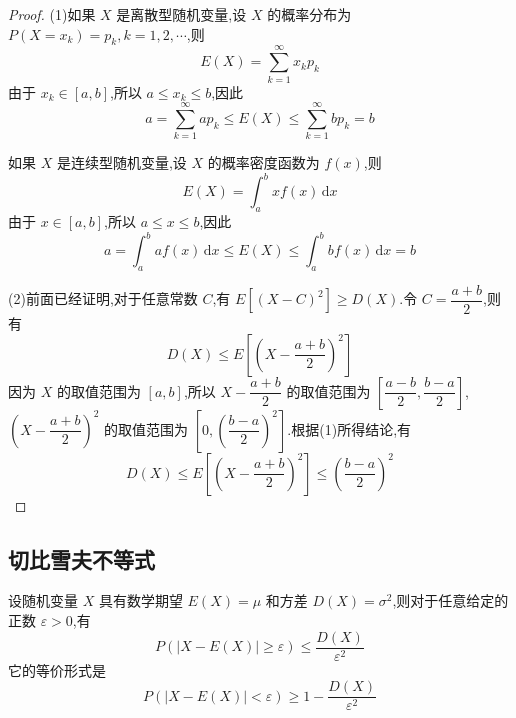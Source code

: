 \begin{proof}
    (1)如果 $X$ 是离散型随机变量,设 $X$ 的概率分布为 $P(X = x_k) = p_k, k=1,2,\cdots$,则
    $$
    E(X) = \sum_{k=1}^{\infty} x_k p_k
    $$
    由于 $x_k \in [a,b]$,所以 $a \leqslant x_k \leqslant b$,因此
    $$
    a = \sum_{k=1}^{\infty} a p_k \leqslant E(X) \leqslant \sum_{k=1}^{\infty} b p_k = b
    $$

    如果 $X$ 是连续型随机变量,设 $X$ 的概率密度函数为 $f(x)$,则
    $$
    E(X) = \int_{a}^{b} x f(x)\,\text{d}x
    $$
    由于 $x \in [a,b]$,所以 $a \leqslant x \leqslant b$,因此
    $$
    a = \int_{a}^{b} a f(x)\,\text{d}x \leqslant E(X) \leqslant \int_{a}^{b} b f(x)\,\text{d}x = b
    $$

    (2)前面已经证明,对于任意常数 $C$,有 $E[(X-C)^2] \geqslant D(X)$.令 $C = \dfrac{a+b}{2}$,则有
    $$
    D(X) \leqslant E[(X - \dfrac{a+b}{2})^2 ]
    $$
    因为 $X$ 的取值范围为 $[a,b]$,所以 $X - \dfrac{a+b}{2}$ 的取值范围为 $\left[ \dfrac{a-b}{2}, \dfrac{b-a}{2} \right]$, $\left( X - \dfrac{a+b}{2} \right)^2$ 的取值范围为 $\left[ 0, \left( \dfrac{b-a}{2} \right)^2 \right]$.根据(1)所得结论,有
    $$
    D(X) \leqslant E[(X - \dfrac{a+b}{2})^2] \leqslant \left( \dfrac{b-a}{2} \right)^2
    $$
\end{proof}

\subsection{切比雪夫不等式}

\begin{theorem}[][切比雪夫不等式]
    \indent 设随机变量 $X$ 具有数学期望 $E(X)=\mu$ 和方差 $D(X) = \sigma^2$,则对于任意给定的正数 $\varepsilon > 0$,有
    \begin{equation}
        P(|X-E(X)| \geqslant \varepsilon) \leqslant \dfrac{D(X)}{\varepsilon^2}
    \end{equation}
    它的等价形式是
    \begin{equation}
        P(|X-E(X)| < \varepsilon) \geqslant 1 - \dfrac{D(X)}{\varepsilon^2}
    \end{equation}
\end{theorem}

